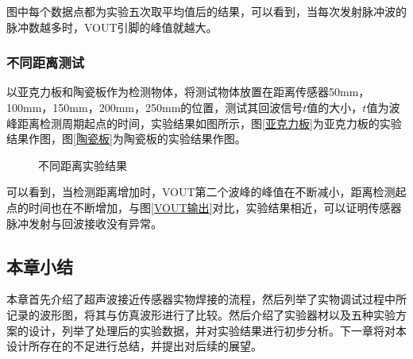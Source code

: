 图中每个数据点都为实验五次取平均值后的结果，可以看到，当每次发射脉冲波的脉冲数越多时，VOUT引脚的峰值就越大。

\subsubsection{不同距离测试}
以亚克力板和陶瓷板作为检测物体，将测试物体放置在距离传感器50mm，100mm，150mm，200mm，250mm的位置，测试其回波信号$t$值的大小，$t$值为波峰距离检测周期起点的时间，实验结果如图所示，图\ref{亚克力板}为亚克力板的实验结果作图，图\ref{陶瓷板}为陶瓷板的实验结果作图。
\begin{figure}[!h]
	\centering
	\caption{不同距离实验结果}
	\label{不同距离实验结果}
\end{figure}\par
可以看到，当检测距离增加时，VOUT第二个波峰的峰值在不断减小，距离检测起点的时间也在不断增加，与图\ref{VOUT输出}对比，实验结果相近，可以证明传感器脉冲发射与回波接收没有异常。
\subsection{本章小结}
本章首先介绍了超声波接近传感器实物焊接的流程，然后列举了实物调试过程中所记录的波形图，将其与仿真波形进行了比较。然后介绍了实验器材以及五种实验方案的设计，列举了处理后的实验数据，并对实验结果进行初步分析。下一章将对本设计所存在的不足进行总结，并提出对后续的展望。







